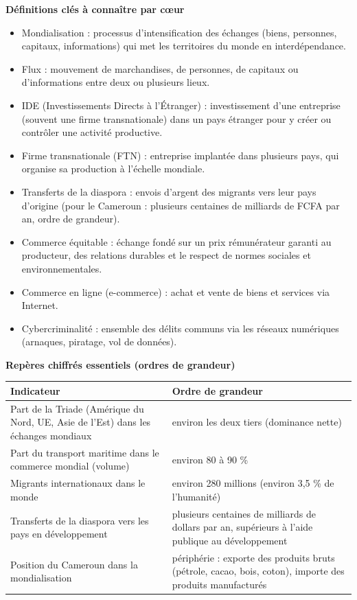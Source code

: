 \documentclass[11pt]{article}
\newcommand{\cle}[1]{{\popxbold\color{popdark}#1}}
\begin{document}
\begin{bilan}
\textbf{Définitions clés à connaître par cœur}
\begin{itemize}
  \item \cle{Mondialisation} : processus d'intensification des échanges (biens, personnes, capitaux, informations) qui met les territoires du monde en interdépendance.
  \item \cle{Flux} : mouvement de marchandises, de personnes, de capitaux ou d'informations entre deux ou plusieurs lieux.
  \item \cle{IDE} (Investissements Directs à l'Étranger) : investissement d'une entreprise (souvent une firme transnationale) dans un pays étranger pour y créer ou contrôler une activité productive.
  \item \cle{Firme transnationale (FTN)} : entreprise implantée dans plusieurs pays, qui organise sa production à l'échelle mondiale.
  \item \cle{Transferts de la diaspora} : envois d'argent des migrants vers leur pays d'origine (pour le Cameroun : plusieurs centaines de milliards de FCFA par an, ordre de grandeur).
  \item \cle{Commerce équitable} : échange fondé sur un prix rémunérateur garanti au producteur, des relations durables et le respect de normes sociales et environnementales.
  \item \cle{Commerce en ligne (e-commerce)} : achat et vente de biens et services via Internet.
  \item \cle{Cybercriminalité} : ensemble des délits communs via les réseaux numériques (arnaques, piratage, vol de données).
\end{itemize}

\textbf{Repères chiffrés essentiels (ordres de grandeur)}

\begin{center}
\begin{tabularx}{\linewidth}{|l|X|}
\hline
\rowcolor{popblueL} \textbf{Indicateur} & \textbf{Ordre de grandeur} \\
\hline
Part de la Triade (Amérique du Nord, UE, Asie de l'Est) dans les échanges mondiaux & environ les deux tiers (dominance nette) \\
\hline
Part du transport maritime dans le commerce mondial (volume) & environ 80 à 90 \% \\
\hline
Migrants internationaux dans le monde & environ 280 millions (environ 3,5 \% de l'humanité) \\
\hline
Transferts de la diaspora vers les pays en développement & plusieurs centaines de milliards de dollars par an, supérieurs à l'aide publique au développement \\
\hline
Position du Cameroun dans la mondialisation & périphérie : exporte des produits bruts (pétrole, cacao, bois, coton), importe des produits manufacturés \\
\hline
\end{tabularx}
\end{center}


\end{bilan}
\end{document}
